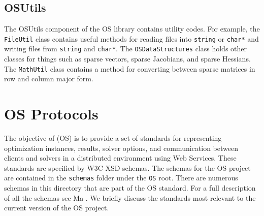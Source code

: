 \documentclass[11pt]{article}
\renewcommand{\_}{{\char"5F}}
\renewcommand{\{}{{\char"7B}}
\renewcommand{\}}{{\char"7D}}
\renewcommand{\^}{{\char"0D}}
\renewcommand{\'}{{\char"0D}}
\begin{document}
\subsection{OSUtils}

The OSUtils component of the OS library contains utility codes. For example, the {\tt FileUtil} class contains useful methods for reading files into {\tt string} or {\tt char*} and writing files from {\tt string} and {\tt char*}.  The {\tt OSDataStructures} class holds other classes for things such as sparse vectors, sparse Jacobians, and sparse Hessians. The {\tt MathUtil} class contains a method for converting between sparse matrices in row and column major form.

\section{OS Protocols}\label{section:schemadescriptions}



The objective of  (OS) is to provide a set of standards for representing optimization instances, results, solver options, and communication between clients and solvers in a distributed environment using Web Services.  These standards are specified by W3C XSD schemas. The schemas for the OS project are contained in the {\tt schemas} folder under the {\tt OS} root. There are numerous schemas in this directory that are part of the OS standard. For a full description of all the schemas see  Ma \cite{junma2005}.  We briefly discuss the standards most relevant to the current version of the OS project. 
\end{document}

